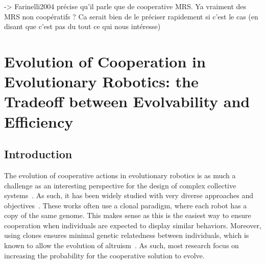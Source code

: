     -> Farinelli2004 précise qu'il parle que de cooperative MRS. Ya vraiment des MRS non coopératifs ? Ca serait bien de le préciser rapidement si c'est le cas (en disant que c'est pas du tout ce qui nous intéresse)









































\section{Evolution of Cooperation in Evolutionary Robotics: the Tradeoff between Evolvability and Efficiency}

  \subsection{Introduction}

  The evolution of cooperative actions in evolutionary robotics is as much a challenge as an interesting perspective for the design of complex collective systems~\cite{Doncieux2015}. As such, it has been widely studied with very diverse approaches and objectives~\cite{Waibel2009, Hauert2014, Trianni2007, Lichocki2012}. These works often use a clonal paradigm, where each robot has a copy of the same genome. This makes sense as this is the easiest way to ensure cooperation when individuals are expected to display similar behaviors. Moreover, using clones ensures minimal genetic relatedness between individuals, which is known to allow the evolution of altruism~\cite{Waibel2011, Montanier2011}. As such, most research focus on increasing the probability for the cooperative solution to evolve.

